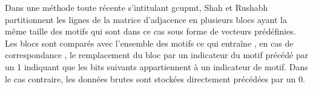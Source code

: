 			Dans une méthode toute récente 
			s'intitulant \gls{gcupmt}, Shah et Rushabh \citep{shah2018graph}  partitionnent les lignes de la matrice d'adjacence en plusieurs blocs ayant la même taille des motifs qui sont dans ce cas sous forme de vecteurs prédéfinies. Les blocs sont comparés avec l'ensemble des motifs ce qui entraîne , en cas de correspondance , le remplacement du bloc par un indicateur du motif précédé par un 1 indiquant que les bits suivants appartiennent à un indicateur de motif. Dans le cas contraire, les données brutes sont stockées directement précédées par un 0.
				